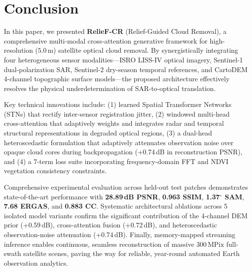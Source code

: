 \section{Conclusion}
\label{sec:conclusion}

In this paper, we presented \textbf{RelieF-CR} (Relief-Guided Cloud Removal), a comprehensive multi-modal cross-attention generative framework for high-resolution ($5.0\,\text{m}$) satellite optical cloud removal. By synergistically integrating four heterogeneous sensor modalities---ISRO LISS-IV optical imagery, Sentinel-1 dual-polarization SAR, Sentinel-2 dry-season temporal references, and CartoDEM 4-channel topographic surface models---the proposed architecture effectively resolves the physical underdetermination of SAR-to-optical translation.

Key technical innovations include: (1) learned Spatial Transformer Networks (STNs) that rectify inter-sensor registration jitter, (2) windowed multi-head cross-attention that adaptively weights and integrates radar and temporal structural representations in degraded optical regions, (3) a dual-head heteroscedastic formulation that adaptively attenuates observation noise over opaque cloud cores during backpropagation (+0.74\,dB in reconstruction PSNR), and (4) a 7-term loss suite incorporating frequency-domain FFT and NDVI vegetation consistency constraints.

Comprehensive experimental evaluation across held-out test patches demonstrates state-of-the-art performance with \textbf{28.89\,dB PSNR}, \textbf{0.963 SSIM}, \textbf{1.37$^\circ$ SAM}, \textbf{7.68 ERGAS}, and \textbf{0.883 CC}. Systematic architectural ablations across 5 isolated model variants confirm the significant contribution of the 4-channel DEM prior (+0.59\,dB), cross-attention fusion (+0.72\,dB), and heteroscedastic observation-noise attenuation (+0.74\,dB). Finally, memory-mapped streaming inference enables continuous, seamless reconstruction of massive $300\,\text{MPix}$ full-swath satellite scenes, paving the way for reliable, year-round automated Earth observation analytics.
